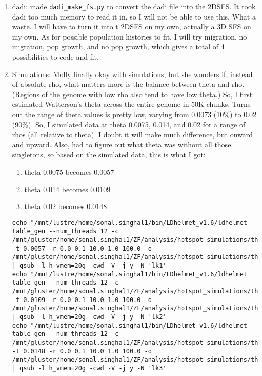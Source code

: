 \documentclass[idxtotoc,hyperref,openany,oneside]{labbook} %
\begin{document}
\begin{enumerate}
\item dadi: made \verb+dadi_make_fs.py+ to convert the dadi file into the 2DSFS. It took dadi too much memory to read it in, so I will not be able to use this. What a waste. I will have to turn it into t 2DSFS on my own, actually a 3D SFS on my own. As for possible population histories to fit, I will try migration, no migration, pop growth, and no pop growth, which gives a total of 4 possibilities to code and fit.
\item Simulations: Molly finally okay with simulations, but she wonders if, instead of absolute rho, what matters more is the balance between theta and rho. (Regions of the genome with low rho also tend to have low theta.) So, I first estimated Watterson's theta across the entire genome in 50K chunks. Turns out the range of theta values is pretty low, varying from 0.0073 (10\%) to 0.02 (90\%). So, I simulated data at theta 0.0075, 0.014, and 0.02 for a range of rhos (all relative to theta). I doubt it will make much difference, but onward and upward. Also, had to figure out what theta was without all those singletons, so based on the simulated data, this is what I got:
\begin{enumerate}
\item theta 0.0075 becomes 0.0057
\item theta 0.014 becomes 0.0109
\item theta 0.02 becomes 0.0148
\end{enumerate}
\begin{verbatim}
echo "/mnt/lustre/home/sonal.singhal1/bin/LDhelmet_v1.6/ldhelmet table_gen --num_threads 12 -c /mnt/gluster/home/sonal.singhal1/ZF/analysis/hotspot_simulations/theta_rho/simulation_theta0.0075.conf -t 0.0057 -r 0.0 0.1 10.0 1.0 100.0 -o /mnt/gluster/home/sonal.singhal1/ZF/analysis/hotspot_simulations/theta_rho/simulation_theta0.0075.lk" | qsub -l h_vmem=20g -cwd -V -j y -N 'lk1'
echo "/mnt/lustre/home/sonal.singhal1/bin/LDhelmet_v1.6/ldhelmet table_gen --num_threads 12 -c /mnt/gluster/home/sonal.singhal1/ZF/analysis/hotspot_simulations/theta_rho/simulation_theta0.014.conf -t 0.0109 -r 0.0 0.1 10.0 1.0 100.0 -o /mnt/gluster/home/sonal.singhal1/ZF/analysis/hotspot_simulations/theta_rho/simulation_theta0.014.lk" | qsub -l h_vmem=20g -cwd -V -j y -N 'lk2'
echo "/mnt/lustre/home/sonal.singhal1/bin/LDhelmet_v1.6/ldhelmet table_gen --num_threads 12 -c /mnt/gluster/home/sonal.singhal1/ZF/analysis/hotspot_simulations/theta_rho/simulation_theta0.02.conf -t 0.0148 -r 0.0 0.1 10.0 1.0 100.0 -o /mnt/gluster/home/sonal.singhal1/ZF/analysis/hotspot_simulations/theta_rho/simulation_theta0.02.lk" | qsub -l h_vmem=20g -cwd -V -j y -N 'lk3'

\end{verbatim}
\end{enumerate}
\end{document}
